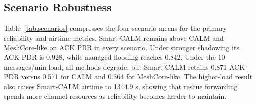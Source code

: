 \documentclass[10pt,conference,letterpaper]{IEEEtran}
\begin{document}
\begin{table}[t]
\caption{Mixed-traffic comparison, means over 20 seeds.}
\label{tab:mixed}
\centering
\scriptsize
{}
\end{table}


\subsection{Scenario Robustness}

Table~\ref{tab:scenarios} compresses the four scenario means for the primary
reliability and airtime metrics. Smart-CALM remains above CALM and
MeshCore-like on ACK PDR in every scenario. Under stronger shadowing its ACK
PDR is 0.928, while managed flooding reaches 0.842. Under the 10 messages/min
load, all methods degrade, but Smart-CALM retains 0.871 ACK PDR versus 0.571
for CALM and 0.364 for MeshCore-like. The higher-load result also raises
Smart-CALM airtime to 1344.9 s, showing that rescue forwarding spends more
channel resources as reliability becomes harder to maintain.
\end{document}
